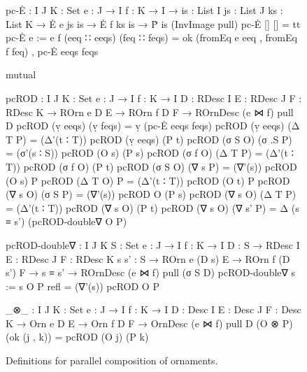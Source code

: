 \begin{figure}
\codefigure
\begin{code}
pc-Ė :  {I J K : Set} {e : J → I} {f : K → I} →
        {is : List I} {js : List J} {ks : List K} →
        Ė e js is → Ė f ks is → Ṗ is (InvImage pull)
pc-Ė               []            []            =  tt
pc-Ė {e := e} {f}  (eeq ∷ eeqs)  (feq ∷ feqs)  =  ok (fromEq e eeq , fromEq f feq) ,
                                                  pc-Ė eeqs feqs

mutual

  pcROD :  {I J K : Set} {e : J → I} {f : K → I}
           {D : RDesc I} {E : RDesc J} {F : RDesc K} →
           ROrn e D E → ROrn f D F → ROrnDesc (e ⋈ f) pull D
  pcROD (ṿ eeqs)    (ṿ feqs)  = ṿ (pc-Ė eeqs feqs)
  pcROD (ṿ eeqs)    (Δ T P)   = (Δ'(t ∶ T))  pcROD (ṿ eeqs)  (P t)
  pcROD (σ S O)     (σ .S P)  = (σ'(s ∶ S))  pcROD (O s)    (P s)
  pcROD (σ f O)     (Δ T P)   = (Δ'(t ∶ T))  pcROD (σ f O)  (P t)
  pcROD (σ S O)     (∇ s P)   = (∇'(s))      pcROD (O s)    P
  pcROD (Δ T O)     P         = (Δ'(t ∶ T))  pcROD (O t)    P
  pcROD (∇ s O)     (σ S P)   = (∇'(s))      pcROD O        (P s)
  pcROD (∇ s O)     (Δ T P)   = (Δ'(t ∶ T))  pcROD (∇ s O)  (P t)
  pcROD (∇ s O)     (∇ s' P)  = Δ (s ≡ s') (pcROD-double∇ O P)

  pcROD-double∇ :
    {I J K S : Set} {e : J → I} {f : K → I}
    {D : S → RDesc I} {E : RDesc J} {F : RDesc K} {s s' : S} →
    ROrn e (D s) E → ROrn f (D s') F →
    s ≡ s' → ROrnDesc (e ⋈ f) pull (σ S D)
  pcROD-double∇ {s := s} O P refl = (∇'(s)) pcROD O P

_⊗_ :  {I J K : Set} {e : J → I} {f : K → I}
       {D : Desc I} {E : Desc J} {F : Desc K} →
       Orn e D E → Orn f D F → OrnDesc (e ⋈ f) pull D
(O ⊗ P) (ok (j , k)) = pcROD (O j) (P k)
\end{code}
\caption{Definitions for parallel composition of ornaments.}
\label{fig:parallel-composition}
\end{figure}

